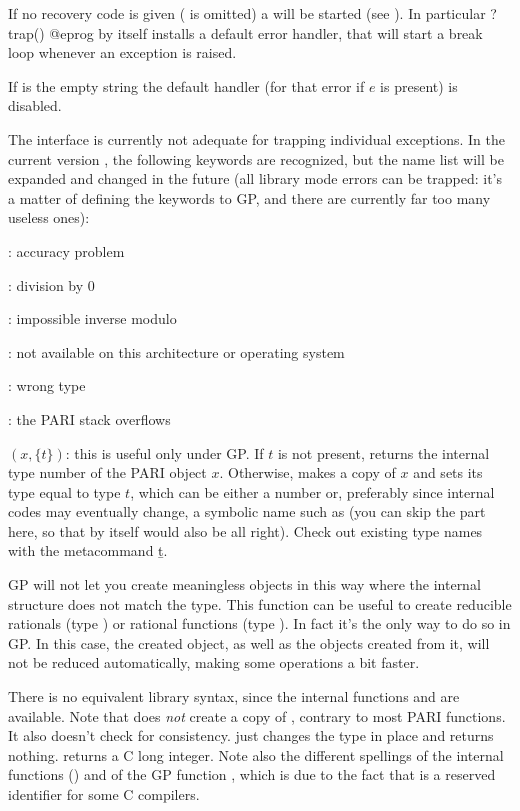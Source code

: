 If no recovery code is given ( is omitted) a  will
be started (see ). In particular
\bprog
? trap()
@eprog
\noindent by itself installs a default error handler, that will start a break
loop whenever an exception is raised.

If  is the empty string  the default handler (for that error
if $e$ is present) is disabled.

 The interface is currently not adequate for trapping
individual exceptions. In the current version \vers, the following keywords
are recognized, but the name list will be expanded and changed in the
future (all library mode errors can be trapped: it's a matter of defining
the keywords to GP, and there are currently far too many useless ones):

: accuracy problem

: division by 0

: impossible inverse modulo

: not available on this architecture or operating system

: wrong type

: the PARI stack overflows

$(x,\{t\})$: this is useful only under GP. If $t$ is
not present, returns the internal type number of the PARI object $x$.
Otherwise, makes a copy of $x$ and sets its type equal to type $t$, which
can be either a number or, preferably since internal codes may eventually
change, a symbolic name such as  (you can skip the \typ{}
part here, so that  by itself would also be all right). Check out
existing type names with the metacommand \b{t}.\label{se:gptype}

  GP will not let you create meaningless objects in this way where the internal
structure does not match the type. This function can be useful to create
reducible rationals (type ) or rational functions (type
). In fact it's the only way to do so in GP. In this case, the
created object, as well as the objects created from it, will not be reduced
automatically, making some operations a bit faster.

There is no equivalent library syntax, since the internal functions 
and  are available. Note that  does \emph{not}
create a copy of , contrary to most PARI functions. It also doesn't
check for consistency.  just changes the type in place and
returns nothing.  returns a C long integer. Note also the different
spellings of the internal functions () and of the GP
function , which is due to the fact that  is a reserved
identifier for some C compilers.

